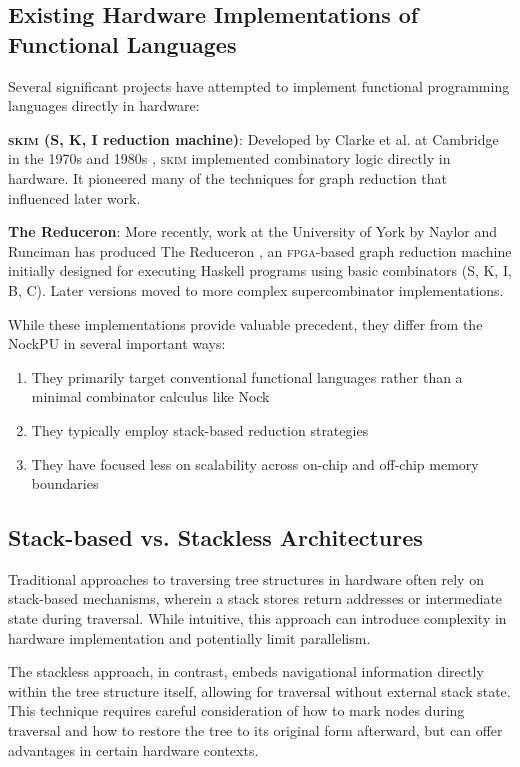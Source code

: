 \documentclass[twoside]{article}
\begin{document}
\subsection{Existing Hardware Implementations of Functional Languages}

Several significant projects have attempted to implement functional programming languages directly in hardware:

\textbf{\textsc{skim} (S, K, I reduction machine)}: Developed by Clarke et al. at Cambridge in the 1970s and 1980s \citep{Clarke1980, Norman1984}, \textsc{skim} implemented combinatory logic directly in hardware. It pioneered many of the techniques for graph reduction that influenced later work.

\textbf{The Reduceron}: More recently, work at the University of York by Naylor and Runciman has produced The Reduceron \citep{Naylor2008, Naylor2009}, an \textsc{fpga}-based graph reduction machine initially designed for executing Haskell programs using basic combinators (S, K, I, B, C). Later versions moved to more complex supercombinator implementations.

While these implementations provide valuable precedent, they differ from the NockPU in several important ways:
\begin{enumerate}
  \item They primarily target conventional functional languages rather than a minimal combinator calculus like Nock
  \item They typically employ stack-based reduction strategies
  \item They have focused less on scalability across on-chip and off-chip memory boundaries
\end{enumerate}

\subsection{Stack-based vs. Stackless Architectures}

Traditional approaches to traversing tree structures in hardware often rely on stack-based mechanisms, wherein a stack stores return addresses or intermediate state during traversal. While intuitive, this approach can introduce complexity in hardware implementation and potentially limit parallelism.

The stackless approach, in contrast, embeds navigational information directly within the tree structure itself, allowing for traversal without external stack state. This technique requires careful consideration of how to mark nodes during traversal and how to restore the tree to its original form afterward, but can offer advantages in certain hardware contexts.
\end{document}
